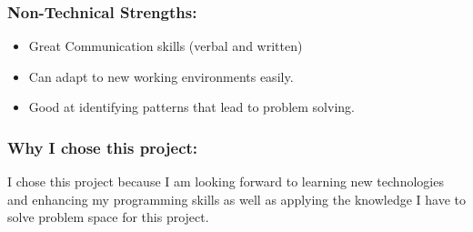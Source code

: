 \subsubsection{Non-Technical Strengths:}
\begin{itemize}
		\item Great Communication skills (verbal and written)
		\item Can adapt to new working environments easily.
		\item Good at identifying patterns that lead to problem solving.
\end{itemize}
\subsubsection{Why I chose this project:}
\par{I chose this project because I am looking forward to learning new technologies and enhancing my programming skills as well as applying the knowledge I have to solve problem space for this project.}
\newpage